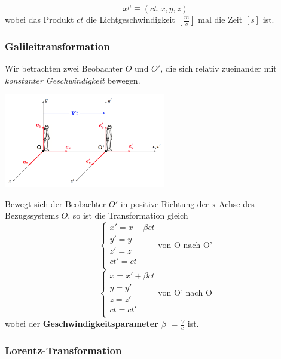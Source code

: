 \documentclass[7pt]{article}
\begin{document}
\begin{multicols*}{3}
\begin{equation*}
	x^\mu \equiv (ct, x, y, z)
\end{equation*}
wobei das Produkt $ct$ die Lichtgeschwindigkeit $[\frac{m}{s}]$ mal die Zeit $[s]$ ist.

\subsubsection{Galileitransformation}

Wir betrachten zwei Beobachter $O$ und $O'$, die sich relativ zueinander mit \emph{konstanter Geschwindigkeit} bewegen.

\begin{center}
	\includegraphics[width=200pt]{images/galileitransformation}
\end{center}

Bewegt sich der Beobachter $O'$ in positive Richtung der x-Achse des Bezugssystems $O$, so ist die Transformation gleich
\begin{equation*}
	\left\{
		\begin{array}{ll}
        	x' = x - \beta ct\\
            y' = y \\
            z' = z \\
            ct' = ct \\
		\end{array}
	\right.
	\text{von O nach O'}
\end{equation*}
\begin{equation*}
	\left\{
		\begin{array}{ll}
        	x = x' + \beta ct\\
            y = y' \\
            z = z' \\
            ct = ct' \\
		\end{array}
	\right.
	\text{von O' nach O}
\end{equation*}
wobei der \textbf{Geschwindigkeitsparameter $\beta$} $= \frac{V}{c}$ ist. 

\subsubsection{Lorentz-Transformation}


\end{multicols*}
\end{document}
